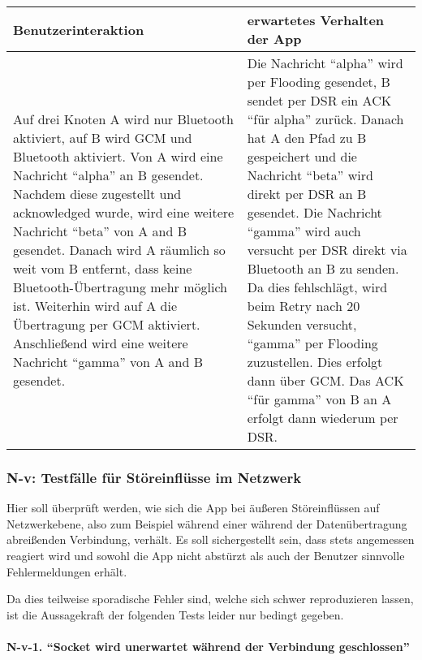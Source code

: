 \begin{longtable}{p{8cm}p{8.5cm}}
\toprule
Benutzerinteraktion & erwartetes Verhalten der App\tabularnewline
\midrule
\endhead
Auf drei Knoten A wird nur Bluetooth aktiviert, auf B wird GCM und
Bluetooth aktiviert. Von A wird eine Nachricht ``alpha'' an B gesendet.
Nachdem diese zugestellt und acknowledged wurde, wird eine weitere
Nachricht ``beta'' von A and B gesendet. Danach wird A räumlich so weit
vom B entfernt, dass keine Bluetooth-Übertragung mehr möglich ist.
Weiterhin wird auf A die Übertragung per GCM aktiviert. Anschließend
wird eine weitere Nachricht ``gamma'' von A and B gesendet. & Die
Nachricht ``alpha'' wird per Flooding gesendet, B sendet per DSR ein ACK
``für alpha'' zurück. Danach hat A den Pfad zu B gespeichert und die
Nachricht ``beta'' wird direkt per DSR an B gesendet. Die Nachricht
``gamma'' wird auch versucht per DSR direkt via Bluetooth an B zu
senden. Da dies fehlschlägt, wird beim Retry nach 20 Sekunden versucht,
``gamma'' per Flooding zuzustellen. Dies erfolgt dann über GCM. Das ACK
``für gamma'' von B an A erfolgt dann wiederum per DSR.\tabularnewline
\bottomrule
\end{longtable}




\clearpage
\subsubsection{N-v: Testfälle für Störeinflüsse im
Netzwerk}\label{v-testfuxe4lle-fuxfcr-stuxf6reinfluxfcsse-im-netzwerk}

Hier soll überprüft werden, wie sich die App bei äußeren Störeinflüssen
auf Netzwerkebene, also zum Beispiel während einer während der
Datenübertragung abreißenden Verbindung, verhält. Es soll sichergestellt
sein, dass stets angemessen reagiert wird und sowohl die App nicht
abstürzt als auch der Benutzer sinnvolle Fehlermeldungen erhält.

Da dies teilweise sporadische Fehler sind, welche sich schwer
reproduzieren lassen, ist die Aussagekraft der folgenden Tests leider
nur bedingt gegeben.

\paragraph{\texorpdfstring{N-v-1. ``Socket wird unerwartet während der
Verbindung
geschlossen''}{N-v-1. Socket wird unerwartet während der Verbindung geschlossen}}\label{socket-wird-unerwartet-wuxe4hrend-der-verbindung-geschlossen}

